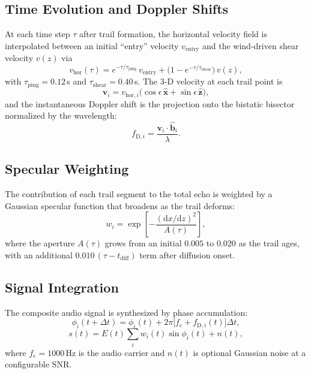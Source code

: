 \documentclass[a4paper,11pt]{article}
\begin{document}
\subsection{Time Evolution and Doppler Shifts}

At each time step $\tau$ after trail formation, the horizontal velocity field is interpolated between an initial ``entry'' velocity $v_{\mathrm{entry}}$ and the wind-driven shear velocity $v(z)$ via
\begin{equation}
    v_{\mathrm{hor}}(\tau) = e^{-\tau/\tau_{\mathrm{ping}}}\,v_{\mathrm{entry}} + \bigl(1 - e^{-\tau/\tau_{\mathrm{shear}}}\bigr)\,v(z),
\end{equation}
with $\tau_{\mathrm{ping}} = 0.12\,$s and $\tau_{\mathrm{shear}} = 0.40\,$s. The 3-D velocity at each trail point is
\begin{equation}
    \mathbf{v}_i = v_{\mathrm{hor},i} \bigl( \cos\epsilon\,\hat{\mathbf{x}} + \sin\epsilon\,\hat{\mathbf{z}} \bigr),
\end{equation}
and the instantaneous Doppler shift is the projection onto the bistatic bisector normalized by the wavelength:
\begin{equation}
    f_{\mathrm{D},i} = \frac{\mathbf{v}_i \cdot \hat{\mathbf{b}}_i}{\lambda}.
\end{equation}

\subsection{Specular Weighting}

The contribution of each trail segment to the total echo is weighted by a Gaussian specular function that broadens as the trail deforms:
\begin{equation}
    w_i = \exp\!\left[ -\frac{(\mathrm{d}x/\mathrm{d}z)^2}{A(\tau)} \right],
\end{equation}
where the aperture $A(\tau)$ grows from an initial $0.005$ to $0.020$ as the trail ages, with an additional $0.010\,(\tau - t_{\mathrm{diff}})$ term after diffusion onset.

\subsection{Signal Integration}

The composite audio signal is synthesized by phase accumulation:
\begin{equation}
    \phi_i(t+\Delta t) = \phi_i(t) + 2\pi \bigl[ f_{\mathrm{c}} + f_{\mathrm{D},i}(t) \bigr] \Delta t,
\end{equation}
\begin{equation}
    s(t) = E(t) \sum_i w_i(t) \sin\phi_i(t) + n(t),
\end{equation}
where $f_{\mathrm{c}} = 1000\,$Hz is the audio carrier and $n(t)$ is optional Gaussian noise at a configurable SNR.
\end{document}
